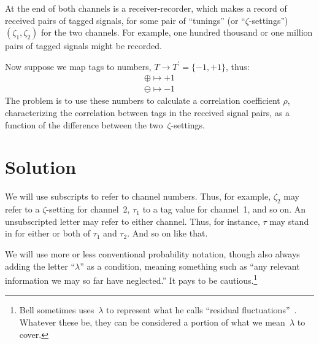 \documentclass[9pt,technote]{IEEEtran}
\begin{document}
At the end of both channels is a receiver-recorder, which makes a
record of received pairs of tagged signals, for some pair of
``tunings'' (or ``$\zeta$-settings'') $(\zeta_1,\zeta_2)$ for the two
channels. For example, one hundred thousand or one million pairs of
tagged signals might be recorded.

Now suppose we map tags to numbers, $T\to T^{\prime}=\{-1,+1\}$, thus:
\begin{align}
  \oplus \mapsto +1 \\
  \ominus \mapsto -1
\end{align}
The problem is to use these numbers to calculate a correlation
coefficient $\rho$, characterizing the correlation between tags in the
received signal pairs, as a function of the difference between the
two~$\zeta$-settings.

\section{Solution}

We will use subscripts to refer to channel numbers. Thus, for example,
$\zeta_2$ may refer to a $\zeta$-setting for channel~2, $\tau_1$ to a
tag value for channel~1, and so on. An unsubscripted letter may refer
to either channel. Thus, for instance, $\tau$ may stand in for either
or both of $\tau_1$ and $\tau_2$. And so on like that.

We will use more or less conventional probability notation, though
also always adding the letter ``$\lambda$'' as a condition, meaning
something such as ``any relevant information we may so far have
neglected.'' It pays to be cautious.\footnote{Bell sometimes
  uses~$\lambda$ to represent what he calls ``residual
  fluctuations''~\cite{bertlmann:manuscript}. Whatever these be, they
  can be considered a portion of what we mean~$\lambda$ to cover.}
\end{document}
